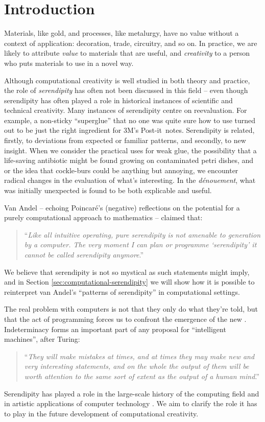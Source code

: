 \section{Introduction}

Materials, like gold, and processes, like metalurgy, have no value
without a context of application: decoration, trade, circuitry, and so
on.  In practice, we are likely to attribute \emph{value} to materials that
are useful, and \emph{creativity} to a person who puts materials to use in a
novel way.

Although computational creativity is well studied in both theory and
practice, the role of \emph{serendipity} has often not been discussed
in this field -- even though serendipity has often played a role in
historical instances of scientific and technical creativity.  Many
instances of serendipity centre on reevaluation.  For example, a
non-sticky ``superglue'' that no one was quite sure how to use turned
out to be just the right ingredient for 3M's
Post-it\texttrademark\ notes.
%
Serendipity is related, firstly, to deviations from expected or
familiar patterns, and secondly, to new insight.
%
When we consider the practical uses for weak glue, the possibility
that a life-saving antibiotic might be found growing on contaminated
petri dishes, and or the idea that cockle-burs could be anything but
annoying, we encounter radical changes in the evaluation of what's
interesting.  In the \emph{d\'enouement}, what was initially
unexpected is found to be both explicable and useful.

Van Andel \citeyear{van1994anatomy} -- echoing Poincar\'e's
\citeyear{poincare1910creation} (negative) reflections on the potential
for a purely computational approach to mathematics -- claimed that:
\begin{quote}
``\emph{Like all intuitive operating, pure serendipity is not amenable
    to generation by a computer.  The very moment I can plan or
    programme `serendipity' it cannot be called serendipity
    anymore}.'' \cite{van1994anatomy}
\end{quote}
We believe that serendipity is not so mystical as such statements
might imply, and in Section \ref{sec:computational-serendipity} we
will show how it is possible to reinterpret van Andel's ``patterns of
serendipity'' in computational settings.

The real problem with computers is not that they only do what they're
told, but that the act of programming forces us to confront the
emergence of the new \cite{mead1932philosophy}.
%
Indeterminacy forms an important part of any proposal for
``intelligent machines'', after Turing:
\begin{quote}
``\emph{They will make mistakes at times, and at times they may make
    new and very interesting statements, and on the whole the output
    of them will be worth attention to the same sort of extent as the
    output of a human mind}.''  \cite{turing-intelligent}
\end{quote}

Serendipity has played a role in the large-scale history of the
computing field \cite{de2013turing} and in artistic applications of
computer technology \cite{reichardt1969cybernetic}.  We aim to clarify
the role it has to play in the future development of computational
creativity.




